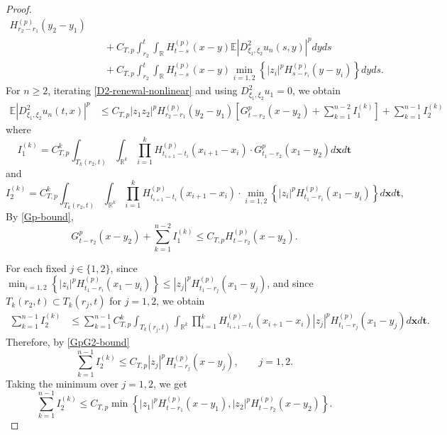 \documentclass[12pt]{article}
\def\bE{\mathbb{E}}
\def\bR{\mathbb{R}}
\begin{document}
\begin{proof}
\begin{equation}
\begin{aligned}
H_{r_2-r_1}^{(p)}(y_2-y_1)
\\
&\quad+
C_{T,p}
\int_{r_2}^t\int_{\bR}
H_{t-s}^{(p)}(x-y)
\bE\left|D^2_{\xi_1,\xi_2}u_n(s,y)\right|^p
dy ds
\\
&\quad+
C_{T,p}
\int_{r_2}^t\int_{\bR}
H_{t-s}^{(p)}(x-y)
\min_{i=1,2}
\left\{
|z_i|^pH_{s-r_i}^{(p)}(y-y_i)
\right\}
dy ds .
\end{aligned}
\end{equation}
 For $n\ge2$, iterating \eqref{D2-renewal-nonlinear} and using
$D^2_{\xi_1,\xi_2}u_1=0$, we obtain
\begin{align*}
\bE\left|D^2_{\xi_1,\xi_2}u_n(t,x)\right|^p&\le C_{T,p}|z_1z_2|^p
H_{r_2-r_1}^{(p)}(y_2-y_1) \left[ G_{t-r_2}^p(x-y_2)+ \sum_{k=1}^{n-2}
I_1^{(k)}\right]+\sum_{k=1}^{n-1}
 I_2^{(k)}
\end{align*}
where
\begin{equation*}
I_1^{(k)}= C_{T,p}^k
\int_{T_k(r_2,t)}
\int_{\bR^k}
\prod_{i=1}^{k}
H_{t_{i+1}-t_i}^{(p)}(x_{i+1}-x_i)\cdot
G_{t_1-r_2}^p(x_1-y_2)
d\pmb{x}d\pmb{t}  
\end{equation*}
and 
\begin{equation*}
I_2^{(k)}= C_{T,p}^k
\int_{T_k(r_2,t)}
\int_{\bR^k}
\prod_{i=1}^{k}
H_{t_{i+1}-t_i}^{(p)}(x_{i+1}-x_i) \cdot
\min_{i=1,2}\left\{
|z_i|^pH_{t_1-r_i}^{(p)}(x_1-y_i)
\right\}
d\pmb{x}d\pmb{t},
\end{equation*}
By \eqref{Gp-bound},
\begin{equation}
\label{D2-source-iteration-bound}
G_{t-r_2}^p(x-y_2)
+
\sum_{k=1}^{n-2} I_1^{(k)}
\le
C_{T,p}H_{t-r_2}^{(p)}(x-y_2).
\end{equation}


For each fixed $j\in\{1,2\}$, since $\min_{i=1,2}
\left\{
|z_i|^pH_{t_1-r_i}^{(p)}(x_1-y_i)
\right\}
\le
|z_j|^pH_{t_1-r_j}^{(p)}(x_1-y_j)$, and since $T_k(r_2,t)\subset T_k(r_j,t)$ for $j=1,2$, we obtain
\begin{align*}
\sum_{k=1}^{n-1} I_2^{(k)}
&\le
\sum_{k=1}^{n-1}
C_{T,p}^k
\int_{T_k(r_j,t)}
\int_{\bR^k}
\prod_{i=1}^{k}
H_{t_{i+1}-t_i}^{(p)}(x_{i+1}-x_i)
|z_j|^pH_{t_1-r_j}^{(p)}(x_1-y_j)
d\pmb{x}d\pmb{t}.
\end{align*}
Therefore, by \eqref{GpG2-bound}
\begin{equation*}
\sum_{k=1}^{n-1} I_2^{(k)}
\le
C_{T,p}
|z_j|^pH_{t-r_j}^{(p)}(x-y_j),
\qquad j=1,2.
\end{equation*}
Taking the minimum over $j=1,2$, we get
\begin{equation}
\label{D2-min-iteration-bound}
\sum_{k=1}^{n-1} I_2^{(k)}
\le
C_{T,p}
\min\left\{
|z_1|^pH_{t-r_1}^{(p)}(x-y_1),
|z_2|^pH_{t-r_2}^{(p)}(x-y_2)
\right\}.
\end{equation}






\end{proof}
\end{document}
